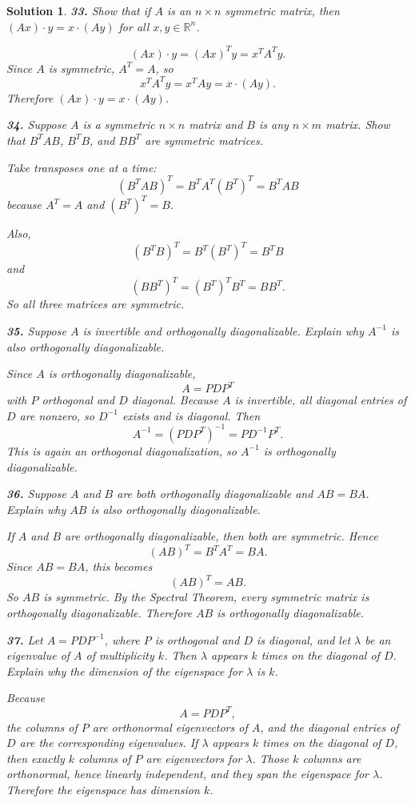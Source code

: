 \documentclass[11pt,a4paper]{article}
\theoremstyle{sol}
\newtheorem*{solution}{Solution}
\newcommand{\R}{\mathbb{R}}
\begin{document}
\begin{solution}
\textbf{33.} \emph{Show that if $A$ is an $n\times n$ symmetric matrix, then $(Ax)\cdot y=x\cdot(Ay)$ for all $x,y\in\R^n$.}

\[
(Ax)\cdot y=(Ax)^Ty=x^TA^Ty.
\]
Since $A$ is symmetric, $A^T=A$, so
\[
x^TA^Ty=x^TAy=x\cdot(Ay).
\]
Therefore $(Ax)\cdot y=x\cdot(Ay)$.

\medskip
\textbf{34.} \emph{Suppose $A$ is a symmetric $n\times n$ matrix and $B$ is any $n\times m$ matrix. Show that $B^TAB$, $B^TB$, and $BB^T$ are symmetric matrices.}

Take transposes one at a time:
\[
(B^TAB)^T=B^TA^T(B^T)^T=B^TAB
\]
because $A^T=A$ and $(B^T)^T=B$.

Also,
\[
(B^TB)^T=B^T(B^T)^T=B^TB
\]
and
\[
(BB^T)^T=(B^T)^TB^T=BB^T.
\]
So all three matrices are symmetric.

\medskip
\textbf{35.} \emph{Suppose $A$ is invertible and orthogonally diagonalizable. Explain why $A^{-1}$ is also orthogonally diagonalizable.}

Since $A$ is orthogonally diagonalizable,
\[
A=PDP^T
\]
with $P$ orthogonal and $D$ diagonal. Because $A$ is invertible, all diagonal entries of $D$ are nonzero, so $D^{-1}$ exists and is diagonal. Then
\[
A^{-1}=(PDP^T)^{-1}=PD^{-1}P^T.
\]
This is again an orthogonal diagonalization, so $A^{-1}$ is orthogonally diagonalizable.

\medskip
\textbf{36.} \emph{Suppose $A$ and $B$ are both orthogonally diagonalizable and $AB=BA$. Explain why $AB$ is also orthogonally diagonalizable.}

If $A$ and $B$ are orthogonally diagonalizable, then both are symmetric. Hence
\[
(AB)^T=B^TA^T=BA.
\]
Since $AB=BA$, this becomes
\[
(AB)^T=AB.
\]
So $AB$ is symmetric. By the Spectral Theorem, every symmetric matrix is orthogonally diagonalizable. Therefore $AB$ is orthogonally diagonalizable.

\medskip
\textbf{37.} \emph{Let $A=PDP^{-1}$, where $P$ is orthogonal and $D$ is diagonal, and let $\lambda$ be an eigenvalue of $A$ of multiplicity $k$. Then $\lambda$ appears $k$ times on the diagonal of $D$. Explain why the dimension of the eigenspace for $\lambda$ is $k$.}

Because
\[
A=PDP^T,
\]
the columns of $P$ are orthonormal eigenvectors of $A$, and the diagonal entries of $D$ are the corresponding eigenvalues. If $\lambda$ appears $k$ times on the diagonal of $D$, then exactly $k$ columns of $P$ are eigenvectors for $\lambda$. Those $k$ columns are orthonormal, hence linearly independent, and they span the eigenspace for $\lambda$. Therefore the eigenspace has dimension $k$.


\end{solution}
\end{document}

